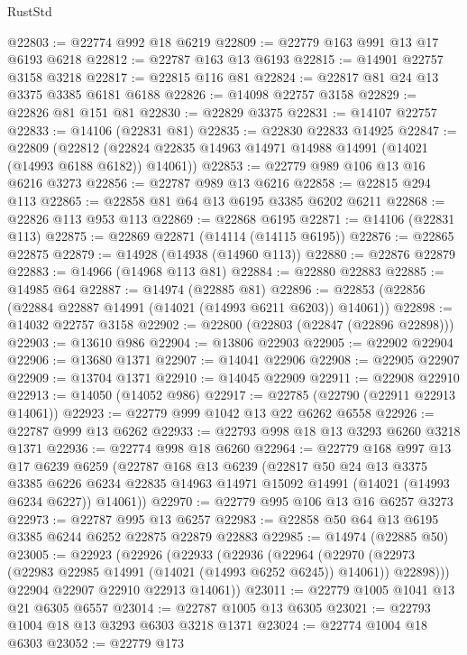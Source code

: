 \begin{lexlean}{RustStd}
\begin{coremodule}
@22803 := @22774 @992 @18 @6219
@22809 := @22779 @163 @991 @13 @17 @6193 @6218
@22812 := @22787 @163 @13 @6193
@22815 := @14901 @22757 @3158 @3218
@22817 := @22815 @116 @81
@22824 := @22817 @81 @24 @13 @3375 @3385 @6181 @6188
@22826 := @14098 @22757 @3158
@22829 := @22826 @81 @151 @81
@22830 := @22829 @3375
@22831 := @14107 @22757
@22833 := @14106 (@22831 @81)
@22835 := @22830 @22833 @14925
@22847 := @22809
    (@22812 (@22824 @22835 @14963 @14971 @14988 @14991 (@14021 (@14993 @6188 @6182)) @14061))
@22853 := @22779 @989 @106 @13 @16 @6216 @3273
@22856 := @22787 @989 @13 @6216
@22858 := @22815 @294 @113
@22865 := @22858 @81 @64 @13 @6195 @3385 @6202 @6211
@22868 := @22826 @113 @953 @113
@22869 := @22868 @6195
@22871 := @14106 (@22831 @113)
@22875 := @22869 @22871 (@14114 (@14115 @6195))
@22876 := @22865 @22875
@22879 := @14928 (@14938 (@14960 @113))
@22880 := @22876 @22879
@22883 := @14966 (@14968 @113 @81)
@22884 := @22880 @22883
@22885 := @14985 @64
@22887 := @14974 (@22885 @81)
@22896 := @22853 (@22856 (@22884 @22887 @14991 (@14021 (@14993 @6211 @6203)) @14061))
@22898 := @14032 @22757 @3158
@22902 := @22800 (@22803 (@22847 (@22896 @22898)))
@22903 := @13610 @986
@22904 := @13806 @22903
@22905 := @22902 @22904
@22906 := @13680 @1371
@22907 := @14041 @22906
@22908 := @22905 @22907
@22909 := @13704 @1371
@22910 := @14045 @22909
@22911 := @22908 @22910
@22913 := @14050 (@14052 @986)
@22917 := @22785 (@22790 (@22911 @22913 @14061))
@22923 := @22779 @999 @1042 @13 @22 @6262 @6558
@22926 := @22787 @999 @13 @6262
@22933 := @22793 @998 @18 @13 @3293 @6260 @3218 @1371
@22936 := @22774 @998 @18 @6260
@22964 := @22779
    @168
    @997
    @13
    @17
    @6239
    @6259
    (@22787
      @168
      @13
      @6239
      (@22817
        @50
        @24
        @13
        @3375
        @3385
        @6226
        @6234
        @22835
        @14963
        @14971
        @15092
        @14991
        (@14021 (@14993 @6234 @6227))
        @14061))
@22970 := @22779 @995 @106 @13 @16 @6257 @3273
@22973 := @22787 @995 @13 @6257
@22983 := @22858 @50 @64 @13 @6195 @3385 @6244 @6252 @22875 @22879 @22883
@22985 := @14974 (@22885 @50)
@23005 := @22923
    (@22926
      (@22933
        (@22936
          (@22964
            (@22970 (@22973 (@22983 @22985 @14991 (@14021 (@14993 @6252 @6245)) @14061)) @22898)))
        @22904
        @22907
        @22910
        @22913
        @14061))
@23011 := @22779 @1005 @1041 @13 @21 @6305 @6557
@23014 := @22787 @1005 @13 @6305
@23021 := @22793 @1004 @18 @13 @3293 @6303 @3218 @1371
@23024 := @22774 @1004 @18 @6303
@23052 := @22779
    @173

\end{coremodule}
\end{lexlean}
